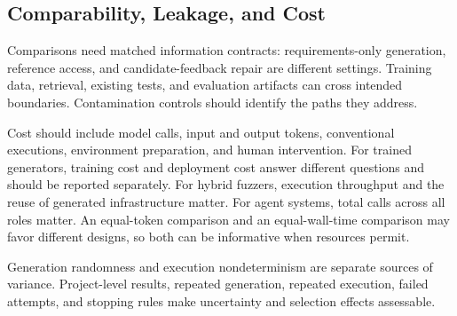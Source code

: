 \subsection{Comparability, Leakage, and Cost}
Comparisons need matched information contracts: requirements-only generation, reference access, and candidate-feedback repair are different settings. Training data, retrieval, existing tests, and evaluation artifacts can cross intended boundaries. Contamination controls should identify the paths they address.

Cost should include model calls, input and output tokens, conventional executions, environment preparation, and human intervention. For trained generators, training cost and deployment cost answer different questions and should be reported separately. For hybrid fuzzers, execution throughput and the reuse of generated infrastructure matter. For agent systems, total calls across all roles matter. An equal-token comparison and an equal-wall-time comparison may favor different designs, so both can be informative when resources permit.

Generation randomness and execution nondeterminism are separate sources of variance. Project-level results, repeated generation, repeated execution, failed attempts, and stopping rules make uncertainty and selection effects assessable.
